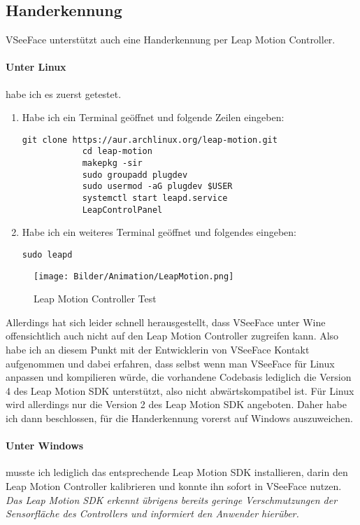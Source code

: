 \documentclass[a4paper, 12pt]{article}
\begin{document}
\subsection{Handerkennung}
\label{subsec:handtracking}
VSeeFace\cite{vseeface} unterstützt auch eine Handerkennung per Leap Motion Controller.
\paragraph{Unter Linux\cite{linux}} habe ich es zuerst getestet\cite{tut-leapmotion-linux}.
\begin{enumerate}
    \item Habe ich ein Terminal geöffnet und folgende Zeilen eingeben:
        \begin{Verbatim}[fontsize=\small]
            git clone https://aur.archlinux.org/leap-motion.git
            cd leap-motion
            makepkg -sir
            sudo groupadd plugdev
            sudo usermod -aG plugdev $USER
            systemctl start leapd.service
            LeapControlPanel
        \end{Verbatim}
    \item Habe ich ein weiteres Terminal geöffnet und folgendes eingeben:
        \begin{Verbatim}[fontsize=\small]
            sudo leapd
        \end{Verbatim}
\end{enumerate}
\begin{figure}[htbp]
    \centering
    \texttt{[image: Bilder/Animation/LeapMotion.png]}
    \caption{Leap Motion Controller Test}
\end{figure}
\newpage
Allerdings hat sich leider schnell herausgestellt, dass VSeeFace\cite{vseeface} unter Wine\cite{wine} offensichtlich auch nicht auf den Leap Motion Controller zugreifen kann.
Also habe ich an diesem Punkt mit der Entwicklerin von VSeeFace\cite{vseeface} Kontakt aufgenommen\cite{vseeface-leapmotion-linux-issue} und dabei erfahren,
dass selbst wenn man VSeeFace\cite{vseeface} für Linux\cite{linux} anpassen und kompilieren würde, die vorhandene Codebasis lediglich die Version 4 des Leap Motion SDK\cite{leapmotion-windows} unterstützt, also nicht abwärtskompatibel ist.
Für Linux\cite{linux} wird allerdings nur die Version 2 des Leap Motion SDK\cite{leapmotion-linux} angeboten.
Daher habe ich dann beschlossen, für die Handerkennung vorerst auf Windows\cite{win10} auszuweichen.
\paragraph{Unter Windows\cite{win10}} musste ich lediglich das entsprechende Leap Motion SDK\cite{leapmotion-windows} installieren,
darin den Leap Motion Controller kalibrieren
und konnte ihn sofort in VSeeFace\cite{vseeface} nutzen.
\\\textit{Das Leap Motion SDK erkennt übrigens bereits geringe Verschmutzungen der Sensorfläche des Controllers und informiert den Anwender hierüber.}
\newpage
\end{document}
